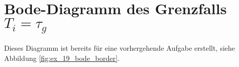 \section{Bode-Diagramm des Grenzfalls $T_i = \tau_g$}
Dieses Diagramm ist bereits für eine vorhergehende Aufgabe erstellt,
siehe Abbildung \ref{fig:ex_19_bode_border}.

